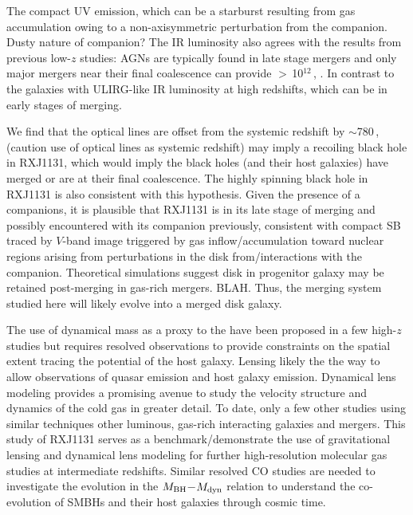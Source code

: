 \documentclass[]{emulateapj}
\begin{document}
The compact UV emission, which can be a starburst resulting from gas accumulation
owing to a non-axisymmetric perturbation from the companion.
Dusty nature of companion?
The IR luminosity also agrees with the results from previous low-$z$ studies: AGNs are
typically found in late stage mergers \citep{Yuan10a,Iwasawa11a,Carpineti12a} and
only major mergers near their final coalescence can provide \LIR$>$\,10$^{12}$\,\Lsun,
\citep[\eg][]{Carpineti15a,Larson16a}. In contrast to the 
galaxies with ULIRG-like IR luminosity at high redshifts, which can be in early stages of merging.

We find that the optical lines are offset from the systemic redshift by $\sim$780\,\kms, (caution use of optical lines 
as systemic redshift)
may imply a recoiling black hole in RXJ1131, which would imply the black
holes (and their host galaxies) have merged or are at their final coalescence.
The highly spinning black hole in RXJ1131 is also consistent with
this hypothesis.
Given the presence of a companions, it is plausible that RXJ1131 is in its late stage of merging and 
possibly encountered with its companion previously, consistent with 
compact SB traced by $V$-band image triggered by gas inflow/accumulation toward nuclear regions 
arising from perturbations in the disk from/interactions with the companion.
Theoretical simulations suggest disk in progenitor galaxy may be retained post-merging in gas-rich 
mergers. BLAH. Thus, the merging system studied here will likely evolve into a merged disk galaxy.

The use of dynamical mass as a proxy to the \bhrelation have been proposed in a few high-$z$ studies 
but requires resolved observations to provide constraints on the spatial extent tracing the potential of 
the host galaxy. Lensing likely the the way to allow observations of quasar emission and 
host galaxy emission. Dynamical lens modeling provides a promising avenue to study the velocity 
structure and dynamics of the cold gas in greater detail. 
To date, only a few other studies using similar techniques \eg other luminous,
gas-rich interacting galaxies and mergers.
This study of RXJ1131 serves as a benchmark/demonstrate the use of gravitational lensing and 
dynamical lens modeling for further high-resolution molecular gas studies at 
intermediate redshifts.  Similar resolved CO studies are needed to investigate the evolution in 
the $M_{\rm BH}$$-$$M_{\rm dyn}$ relation to understand the co-evolution of SMBHs and their 
host galaxies through cosmic time.
\end{document}
